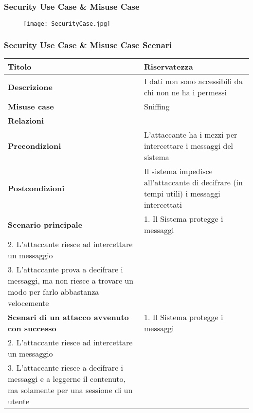 \newpage
\subsubsection{Security Use Case \& Misuse Case}
\par

\begin{figure}[h!]
  \begin{center}
      \texttt{[image: SecurityCase.jpg]}
  \end{center}
\end{figure}
\newpage


\subsubsection{Security Use Case \& Misuse Case Scenari}
\hfill

\begin{tabular} {|P{4cm}|P{13cm}|}
\hline
  \textbf{Titolo} & Riservatezza\\
\hline
  \textbf{Descrizione} & I dati non sono accessibili da chi non ne ha i permessi\\
\hline
  \textbf{Misuse case} & Sniffing\\
\hline
  \textbf{Relazioni} &\\
\hline
  \textbf{Precondizioni} & L'attaccante ha i mezzi per intercettare i messaggi del sistema\\
\hline
  \textbf{Postcondizioni} & Il sistema impedisce all'attaccante di decifrare (in tempi utili) i messaggi intercettati\\
\hline
  \textbf{Scenario principale} & 1. Il Sistema protegge i messaggi \\ 2. L'attaccante riesce ad intercettare un messaggio \\ 3. L'attaccante prova a decifrare i messaggi, ma non riesce a trovare un modo per farlo abbastanza velocemente\\
\hline
  \textbf{Scenari di un attacco avvenuto con successo} & 1. Il Sistema protegge i messaggi \\ 2. L'attaccante riesce ad intercettare un messaggio \\ 3. L'attaccante riesce a decifrare i messaggi e a leggerne il contenuto, ma solamente per una sessione di un utente\\
\hline
\end{tabular}

\hfill
\break

